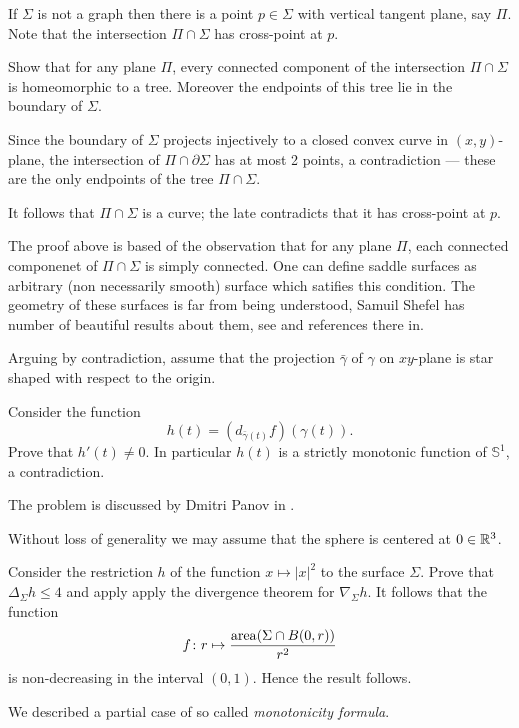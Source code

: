 If $\Sigma$ is not a graph then there is a point $p\in\Sigma$ with vertical tangent plane, say $\Pi$.
Note that the intersection $\Pi\cap\Sigma$ has cross-point at $p$.

Show that for any plane $\Pi$,
every connected component of the intersection $\Pi\cap\Sigma$ is homeomorphic to a tree.
Moreover the endpoints of this tree lie in the boundary of $\Sigma$.

Since the boundary of $\Sigma$ projects injectively to a closed convex curve in $(x,y)$-plane,
the intersection of $\Pi\cap\partial \Sigma$ has at most 2 points,
a contradiction --- these are the only endpoints of the tree $\Pi\cap\Sigma$.

It follows that $\Pi\cap\Sigma$ is a curve; the late contradicts that it has cross-point at $p$.\qeds

The proof above is based of the observation 
that for any plane $\Pi$,
each connected componenet of $\Pi\cap\Sigma$ is simply connected.
One can define saddle surfaces as arbitrary (non necessarily smooth) surface which satifies this condition.
The geometry of these surfaces is far from being understood,
Samuil Shefel has number of beautiful results about them, 
see \cite{shefel} and references there in.


Arguing by contradiction, assume that the projection $\bar\gamma$
of $\gamma$ on $x y$-plane is star shaped with respect to the origin.

Consider the function 
$$h(t)=(d_{\bar\gamma(t)}f)(\gamma(t)).$$
Prove that $h'(t)\ne 0$.
In particular $h(t)$ is a strictly monotonic function of $\mathbb{S}^1$, a contradiction.\qeds

The problem is discussed by Dmitri Panov in \cite{panov-curves}.

Without loss of generality we may assume that the sphere is centered at $0\in\mathbb{R}^3$.

Consider the restriction $h$ of the function $x\mapsto |x|^2$ to the surface $\Sigma$.
Prove that $\Delta_\Sigma h\le 4$ and apply apply the divergence theorem for $\nabla_\Sigma h$.
It follows that the function
\[f\colon r\mapsto \frac{\operatorname{\rm area}(\Sigma\cap B(0,r))}{r^2}
\]
is non-decreasing in the interval $(0,1)$.
Hence the result follows.\qeds

We described a partial case of so called \emph{monotonicity formula}.

